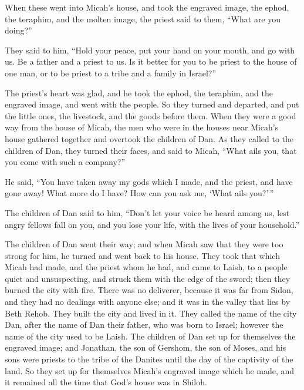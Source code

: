  When these went into Micah's house, and took the
engraved image, the ephod, the teraphim, and the molten image, the
priest said to them, ``What are you doing?''

 They said to him, ``Hold your peace, put your hand on
your mouth, and go with us. Be a father and a priest to us. Is it better
for you to be priest to the house of one man, or to be priest to a tribe
and a family in Israel?''

 The priest's heart was glad, and he took the ephod, the
teraphim, and the engraved image, and went with the people.
 So they turned and departed, and put the little ones,
the livestock, and the goods before them.  When they were
a good way from the house of Micah, the men who were in the houses near
Micah's house gathered together and overtook the children of Dan.
 As they called to the children of Dan, they turned their
faces, and said to Micah, ``What ails you, that you come with such a
company?''

 He said, ``You have taken away my gods which I made, and
the priest, and have gone away! What more do I have? How can you ask me,
`What ails you?'\,''

 The children of Dan said to him, ``Don't let your voice
be heard among us, lest angry fellows fall on you, and you lose your
life, with the lives of your household.''

 The children of Dan went their way; and when Micah saw
that they were too strong for him, he turned and went back to his house.
 They took that which Micah had made, and the priest whom
he had, and came to Laish, to a people quiet and unsuspecting, and
struck them with the edge of the sword; then they burned the city with
fire.  There was no deliverer, because it was far from
Sidon, and they had no dealings with anyone else; and it was in the
valley that lies by Beth Rehob. They built the city and lived in it.
 They called the name of the city Dan, after the name of
Dan their father, who was born to Israel; however the name of the city
used to be Laish.  The children of Dan set up for
themselves the engraved image; and Jonathan, the son of Gershom, the son
of Moses, and his sons were priests to the tribe of the Danites until
the day of the captivity of the land.  So they set up for
themselves Micah's engraved image which he made, and it remained all the
time that God's house was in Shiloh.

